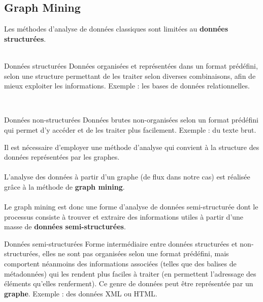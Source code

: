 	\subsection{Graph Mining}
	\begin{frame}
		Les méthodes d'analyse de données classiques sont limitées au \textbf{données structurées}.
		\\~\\
		\pause
		\begin{block}{Données structurées}
		Données organisées et représentées dans un format prédéfini, selon une structure permettant de les traiter selon diverses combinaisons, afin de mieux exploiter les informations. Exemple : les bases de données relationnelles.
		\end{block}
		~\\	
		\pause
		\begin{block}{Données non-structurées}
		Données brutes non-organisées selon un format prédéfini qui permet d'y accéder et de les traiter plus facilement. Exemple : du texte brut.
		\end{block}
	\end{frame}
	\begin{frame}
		Il est nécessaire d'employer une méthode d'analyse qui convient à la structure des données représentées par les graphes.
		\\~\\
		\pause
		L'analyse des données à partir d'un graphe (de flux dans notre cas) est réalisée grâce à la méthode de \textbf{graph mining}.
		\\~\\
		\pause
		Le graph mining est donc une forme d'analyse de données semi-structurée dont le processus consiste à trouver et extraire des informations utiles à partir d'une masse de \textbf{données semi-structurées}.
		\\
		\pause
		\begin{block}{Données semi-structurées}
		Forme intermédiaire entre données structurées et non-structurées, elles ne sont pas organisées selon une format prédéfini, mais comportent néanmoins des informations associées (telles que des balises de métadonnées) qui les rendent plus faciles à traiter (en permettent l'adressage des éléments qu'elles renferment). Ce genre de données peut être représentée par un \textbf{graphe}. Exemple : des données XML ou HTML.
		\end{block}
	\end{frame}
